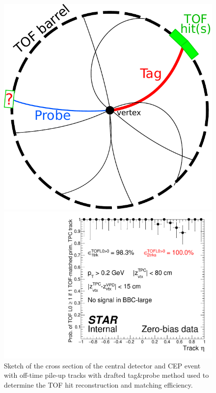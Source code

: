 \begin{figure}[b!]%
\centering%
\begin{minipage}{.4725\textwidth}%
  \centering%
  \includegraphics[width=0.98\linewidth]{graphics/systematicsEfficiency/TOF_tagAndProbe/sketch.pdf}%
  \caption[Sketch of the tag\&probe method.]%
  {Sketch of the cross section of the central detector and CEP event with off-time pile-up tracks with drafted tag\&probe method used to determine the TOF hit reconstruction and matching efficiency. }\label{fig:tagAndProbeSketch}
\end{minipage}%
\quad\quad%
\begin{minipage}{.4725\textwidth}%
  \centering%
  \includegraphics[width=\linewidth]{graphics/systematicsEfficiency/TOF_tagAndProbe/TofL0Eff_1TofVtx_1TofTrack.pdf}%

\end{minipage}
\end{figure}
